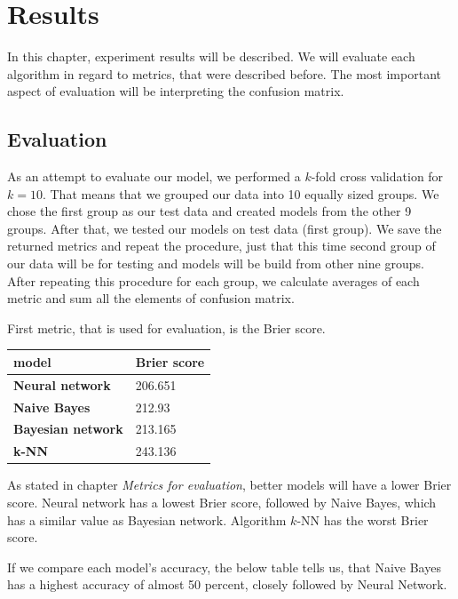 \documentclass[conference]{IEEEtran}
\begin{document}
\section{Results}

In this chapter, experiment results will be described. We will evaluate each algorithm
in regard to metrics, that were described before. The most important aspect of evaluation
will be interpreting the confusion matrix.

\subsection{Evaluation}

As an attempt to evaluate our model, we performed a $k$-fold cross validation
for $k=10$. That means that we grouped our data into 10 equally sized groups. We 
chose the first group as our test data and created models from the other 9 
groups. After that, we tested our models on test data (first group). We save the
returned metrics and repeat the procedure, just that this time second group of our data 
will be for testing and models will be build from other nine groups. After repeating this
procedure for each group, we calculate averages of each metric and sum all the elements
of confusion matrix. 

First metric, that is used for evaluation, is the Brier score. 

\begin{table}[!ht]
    \centering
    \begin{tabular}{ll}
        model & Brier score \\ \hline
        \textbf{Neural network} & 206.651 \\ 
        \textbf{Naive Bayes} & 212.93 \\ 
        \textbf{Bayesian network} & 213.165 \\ 
        \textbf{k-NN} & 243.136 \\ 
    \end{tabular}
\end{table}

As stated in chapter \textit{Metrics for evaluation}, better models will have a lower 
Brier score. Neural network has a lowest Brier score, followed by Naive Bayes, which has 
a similar value as Bayesian network. Algorithm $k$-NN has the worst Brier score.

If we compare each model's accuracy, the below table tells us, that Naive Bayes has a 
highest accuracy of almost 50 percent, closely followed by Neural Network.
\end{document}
